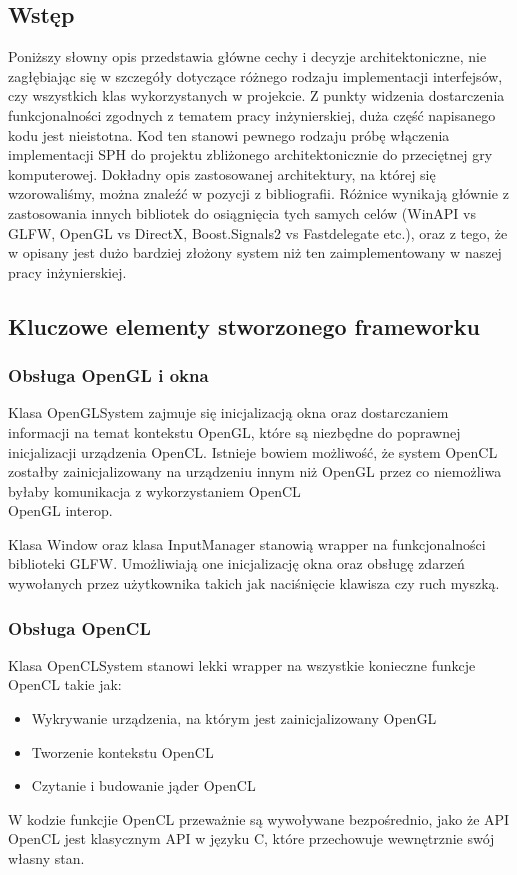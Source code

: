 \documentclass[polish, 12pt]{aghthesis}
\begin{document}
	\subsection{Wstęp}
		Poniższy słowny opis przedstawia główne cechy i decyzje architektoniczne, nie zagłębiając się w szczegóły dotyczące różnego rodzaju implementacji interfejsów, czy wszystkich klas wykorzystanych w projekcie. Z punkty widzenia dostarczenia funkcjonalności zgodnych z tematem pracy inżynierskiej, duża część napisanego kodu jest nieistotna. Kod ten stanowi pewnego rodzaju próbę włączenia implementacji SPH do projektu zbliżonego architektonicznie do przeciętnej gry komputerowej. Dokładny opis zastosowanej architektury, na której się wzorowaliśmy, można znaleźć w pozycji \cite{GameCodingComplete} z bibliografii. Różnice wynikają głównie z zastosowania innych bibliotek do osiągnięcia tych samych celów (WinAPI vs GLFW, OpenGL vs DirectX, Boost.Signals2 vs Fastdelegate etc.), oraz z tego, że w \cite{GameCodingComplete} opisany jest dużo bardziej złożony system niż ten zaimplementowany w naszej pracy inżynierskiej.
	
	\subsection{Kluczowe elementy stworzonego frameworku}
		\subsubsection{Obsługa OpenGL i okna}
			Klasa OpenGLSystem zajmuje się inicjalizacją okna oraz dostarczaniem informacji na temat kontekstu OpenGL, które są niezbędne do poprawnej inicjalizacji urządzenia OpenCL. Istnieje bowiem możliwość, że system OpenCL zostałby zainicjalizowany na urządzeniu innym niż OpenGL przez co niemożliwa byłaby komunikacja z wykorzystaniem OpenCL\\OpenGL interop.
			
			Klasa Window oraz klasa InputManager stanowią wrapper na funkcjonalności biblioteki GLFW. Umożliwiają one inicjalizację okna oraz obsługę zdarzeń wywołanych przez użytkownika takich jak naciśnięcie klawisza czy ruch myszką. 
			
		\subsubsection{Obsługa OpenCL}
			Klasa OpenCLSystem stanowi lekki wrapper na wszystkie konieczne funkcje OpenCL takie jak:
			\begin{itemize}
				\item Wykrywanie urządzenia, na którym jest zainicjalizowany OpenGL
				\item Tworzenie kontekstu OpenCL
				\item Czytanie i budowanie jąder OpenCL
			\end{itemize}
			W kodzie funkcjie OpenCL przeważnie są wywoływane bezpośrednio, jako że API OpenCL jest klasycznym API w języku C, które przechowuje wewnętrznie swój własny stan.
			
\end{document}

